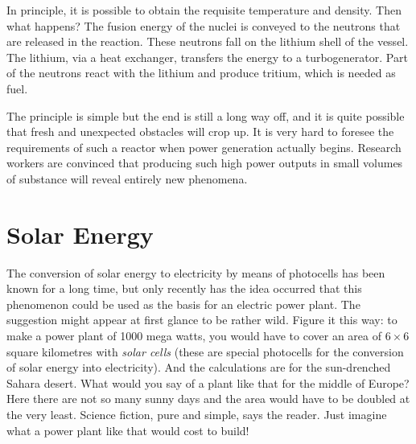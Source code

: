 In principle, it is possible to obtain the requisite tem­perature and density. Then what happens? The fusion energy of the nuclei is conveyed to the neutrons that are released in the reaction. These neutrons fall on the lithium shell of the vessel. The lithium, via a heat exchanger, transfers the energy to a turbogenerator. Part of the neutrons react with the lithium and produce tritium, which is needed as fuel.

The principle is simple but the end is still a long way off, and it is quite possible that fresh and unexpected obstacles will crop up. It is very hard to foresee the requirements of such a reactor when power generation ac­tually begins. Research workers are convinced that pro­ducing such high power outputs in small volumes of substance will reveal entirely new phenomena.


\section{Solar Energy}

The conversion of solar energy to electricity by means of photocells has been known for a long time, but only recently has the idea occurred that this phenomenon could be used as the basis for an electric power plant. The suggestion might appear at first glance to be rather wild. Figure it this way: to make a power plant of 1000 mega­ watts, you would have to cover an area of $6\times6$ square kilometres with \emph{solar cells} (these are special photocells for the conversion of solar energy into electricity). And the calculations are for the sun-drenched Sahara desert. What would you say of a plant like that for the middle of Europe? Here there are not so many sunny days and the area would have to be doubled at the very least. Science fiction, pure and simple, says the reader. Just imagine what a power plant like that would cost to build!

